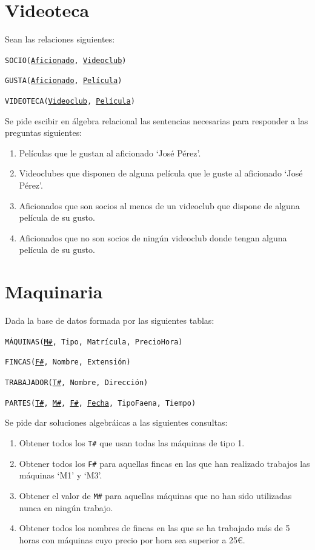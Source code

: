 \documentclass[a4paper]{article}
\begin{document}
\section{Videoteca}

Sean las relaciones siguientes:

\texttt{SOCIO(\underline{Aficionado}, \underline{Videoclub})}

\texttt{GUSTA(\underline{Aficionado}, \underline{Película})}

\texttt{VIDEOTECA(\underline{Videoclub}, \underline{Película})}

Se pide escibir en álgebra relacional las sentencias necesarias para responder a las preguntas siguientes:

\begin{enumerate}
    \item Películas que le gustan al aficionado `José Pérez'.
    \item Videoclubes que disponen de alguna película que le guste al aficionado `José Pérez'.
    \item Aficionados que son socios al menos de un videoclub que dispone de alguna película de su gusto.
    \item Aficionados que no son socios de ningún videoclub donde tengan alguna película de su gusto.
\end{enumerate}

\section{Maquinaria}

Dada la base de datos formada por las siguientes tablas:

\texttt{MÁQUINAS(\underline{M\#}, Tipo, Matrícula, PrecioHora)}

\texttt{FINCAS(\underline{F\#}, Nombre, Extensión)}

\texttt{TRABAJADOR(\underline{T\#}, Nombre, Dirección)}

\texttt{PARTES(\underline{T\#}, \underline{M\#}, \underline{F\#}, \underline{Fecha}, TipoFaena, Tiempo)}

Se pide dar soluciones algebráicas a las siguientes consultas:

\begin{enumerate}
    \item Obtener todos los \texttt{T\#} que usan todas las máquinas de tipo 1.
    \item Obtener todos los \texttt{F\#} para aquellas fincas en las que han realizado trabajos las máquinas `M1' y `M3'.
    \item Obtener el valor de \texttt{M\#} para aquellas máquinas que no han sido utilizadas nunca en ningún trabajo.
    \item Obtener todos los nombres de fincas en las que se ha trabajado más de 5 horas con máquinas cuyo precio por hora sea superior a 25€.
\end{enumerate}
\end{document}
